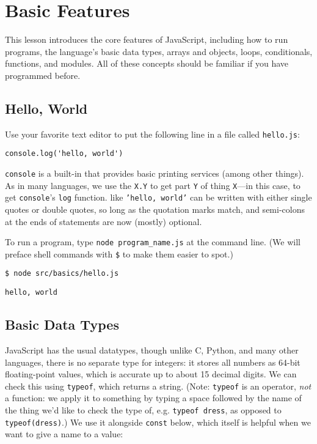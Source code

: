 \chapter{Basic Features}\label{s:basics}

This lesson introduces the core features of JavaScript,
including how to run programs,
the language's basic data types,
arrays and objects,
loops,
conditionals,
functions,
and modules.
All of these concepts should be familiar if you have programmed before.

\section{Hello, World}\label{s:basics-hello-world}

Use your favorite text editor to put the following line in a file called \texttt{hello.js}:

\begin{verbatim}
console.log('hello, world')
\end{verbatim}

\texttt{console} is a built-in  that provides basic printing services
(among other things).
As in many languages,
we use the  \texttt{X.Y} to get part \texttt{Y} of thing \texttt{X}---in this case,
to get \texttt{console}'s \texttt{log} function.
 like \texttt{'hello,\ world'} can be written with either single quotes or double quotes,
so long as the quotation marks match,
and semi-colons at the ends of statements are now (mostly) optional.

To run a program,
type \texttt{node\ program\_name.js} at the command line.
(We will preface shell commands with \texttt{\$} to make them easier to spot.)

\begin{verbatim}
$ node src/basics/hello.js
\end{verbatim}

\begin{verbatim}
hello, world
\end{verbatim}

\section{Basic Data Types}\label{s:basics-data-types}

JavaScript has the usual datatypes,
though unlike C, Python, and many other languages,
there is no separate type for integers:
it stores all numbers as 64-bit floating-point values,
which is accurate up to about 15 decimal digits.
We can check this using \texttt{typeof},
which returns a string.
(Note: \texttt{typeof} is an operator,
\emph{not} a function:
we apply it to something by typing a space followed by
the name of the thing we'd like to check the type of,
e.g. \texttt{typeof dress}, as opposed to \texttt{typeof(dress)}.)
We use it alongside \texttt{const} below,
which itself is helpful when we want to give a name to a
 value:

